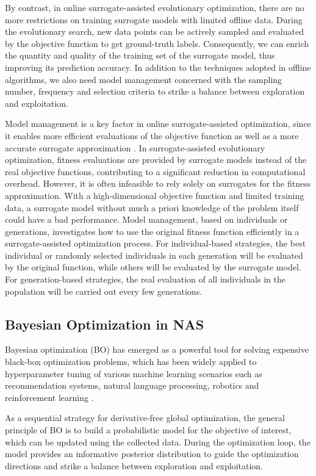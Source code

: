 \documentclass[journal]{IEEEtran}
\begin{document}
By contrast, in online surrogate-assisted evolutionary optimization, there are no more restrictions on training surrogate models with limited offline data. During the evolutionary search, new data points can be actively sampled and evaluated by the objective function to get ground-truth labels. Consequently, we can enrich the quantity and quality of the training set of the surrogate model, thus improving its prediction accuracy. In addition to the techniques adopted in offline algorithms, we also need model management concerned with the sampling number, frequency and selection criteria to strike a balance between exploration and exploitation.

Model management is a key factor in online surrogate-assisted optimization, since it enables more efficient evaluations of the objective function as well as a more accurate surrogate approximation \cite{jin2018data}. In surrogate-assisted evolutionary optimization, fitness evaluations are provided by surrogate models instead of the real objective functions, contributing to a significant reduction in computational overhead. However, it is often infeasible to rely solely on surrogates for the fitness approximation. With a high-dimensional objective function and limited training data, a surrogate model without much a priori knowledge of the problem itself could have a bad performance. Model management, based on individuals or generations, investigates how to use the original fitness function efficiently in a surrogate-assisted optimization process. For individual-based strategies, the best individual or randomly selected individuals in each generation will be evaluated by the original function, while others will be evaluated by the surrogate model. For generation-based strategies, the real evaluation of all individuals in the population will be carried out every few generations. 

\subsection{Bayesian Optimization in NAS}

Bayesian optimization (BO) has emerged as a powerful tool for solving expensive black-box optimization problems, which has been widely applied to hyperparameter tuning of various machine learning scenarios such as recommendation systems, natural language processing, robotics and reinforcement learning \cite{shahriari2015taking, snoek2012practical}.

As a sequential strategy for derivative-free global optimization, the general principle of BO is to build a probabilistic model for the objective of interest, which can be updated using the collected data. During the optimization loop, the model provides an informative posterior distribution to guide the optimization directions and strike a balance between exploration and exploitation. 
\end{document}
